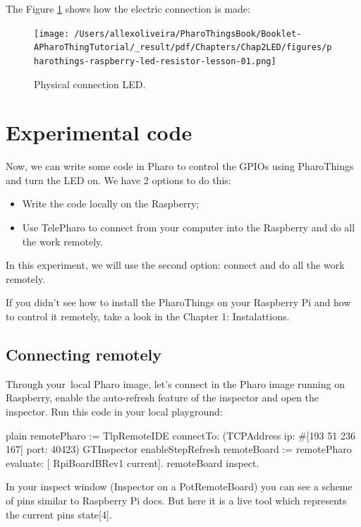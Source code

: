 \documentclass[10pt,twoside,english]{_support/latex/sbabook/sbabook}
\begin{document}
The Figure \ref{physicalLed} shows how the electric connection is made:


\begin{figure}

\begin{center}
\texttt{[image: /Users/allexoliveira/PharoThingsBook/Booklet-APharoThingTutorial/\_result/pdf/Chapters/Chap2LED/figures/pharothings-raspberry-led-resistor-lesson-01.png]}\caption{Physical connection LED.\label{physicalLed}}\end{center}
\end{figure}

\section{Experimental code}
Now, we can write some code in Pharo to control the GPIOs using PharoThings and turn the LED on. We have 2 options to do this:

\begin{itemize}
\item Write the code locally on the Raspberry;
\item Use TelePharo to connect from your computer into the Raspberry and do all the work remotely.
\end{itemize}

In this experiment, we will use the second option: connect and do all the work remotely. 

If you didn’t see how to install the PharoThings on your Raspberry Pi and how to control it remotely, take a look in the Chapter 1: Instalattions.
\subsection{Connecting remotely}
Through your local Pharo image, let's connect in the Pharo image running on Raspberry, enable the auto-refresh feature of the inspector and open the inspector. Run this code in your local playground:

\begin{displaycode}{plain}
remotePharo := TlpRemoteIDE connectTo: (TCPAddress ip: #[193 51 236 167] port: 40423)
GTInspector enableStepRefresh
remoteBoard := remotePharo evaluate: [ RpiBoardBRev1 current].
remoteBoard inspect.
\end{displaycode}

In your inspect window (Inspector on a PotRemoteBoard) you can see a scheme of pins similar to Raspberry Pi docs. But here it is a live tool which represents the current pins state{[}4{]}.
\end{document}
